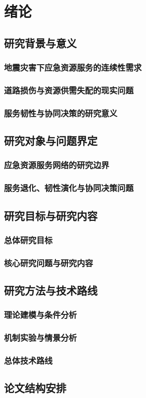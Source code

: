 \chapter{绪论}
\label{chap:introduction}

\section{研究背景与意义}
\subsection{地震灾害下应急资源服务的连续性需求}
\subsection{道路损伤与资源供需失配的现实问题}
\subsection{服务韧性与协同决策的研究意义}

\ThesisBlank

\section{研究对象与问题界定}
\subsection{应急资源服务网络的研究边界}
\subsection{服务退化、韧性演化与协同决策问题}

\ThesisBlank

\section{研究目标与研究内容}
\subsection{总体研究目标}
\subsection{核心研究问题与研究内容}

\ThesisBlank

\section{研究方法与技术路线}
\subsection{理论建模与条件分析}
\subsection{机制实验与情景分析}
\subsection{总体技术路线}

\ThesisBlank

\section{论文结构安排}
\ThesisBlank

